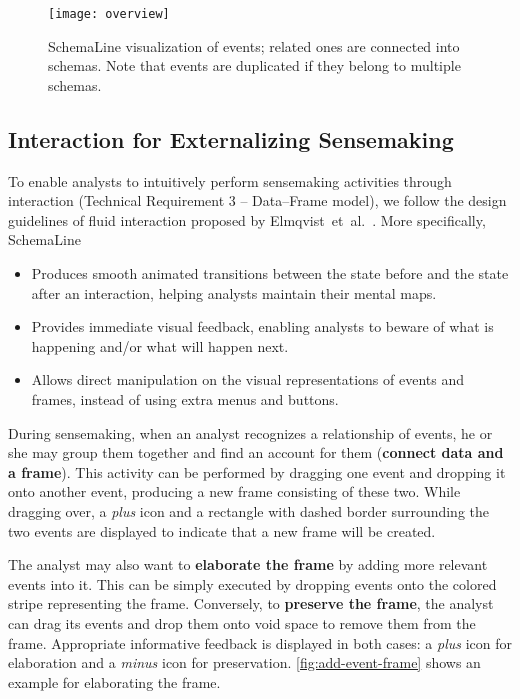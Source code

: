 \begin{figure}
	\centering
	\texttt{[image: overview]}
	\caption[SchemaLine visualization of events]{SchemaLine visualization of events; related ones are connected into schemas. Note that events are duplicated if they belong to multiple schemas.}
	\label{fig:sl-overview}
\end{figure}

\subsection{Interaction for Externalizing Sensemaking}
To enable analysts to intuitively perform sensemaking activities through interaction (Technical Requirement 3 -- Data--Frame model), we follow the design guidelines of fluid interaction proposed by Elmqvist~et~al.~\cite{Elmqvist2011}. More specifically, SchemaLine
\begin{itemize}
	\item Produces smooth animated transitions between the state before and the state after an interaction, helping analysts maintain their mental maps.
	\item Provides immediate visual feedback, enabling analysts to beware of what is happening and/or what will happen next.
	\item Allows direct manipulation on the visual representations of events and frames, instead of using extra menus and buttons.
\end{itemize}

During sensemaking, when an analyst recognizes a relationship of events, he or she may group them together and find an account for them (\textbf{connect data and a frame}). This activity can be performed by dragging one event and dropping it onto another event, producing a new frame consisting of these two. While dragging over, a \emph{plus} icon and a rectangle with dashed border surrounding the two events are displayed to indicate that a new frame will be created.

The analyst may also want to \textbf{elaborate the frame} by adding more relevant events into it. This can be simply executed by dropping events onto the colored stripe representing the frame. Conversely, to \textbf{preserve the frame}, the analyst can drag its events and drop them onto void space to remove them from the frame. Appropriate informative feedback is displayed in both cases: a \emph{plus} icon for elaboration and a \emph{minus} icon for preservation. \autoref{fig:add-event-frame} shows an example for elaborating the frame.

